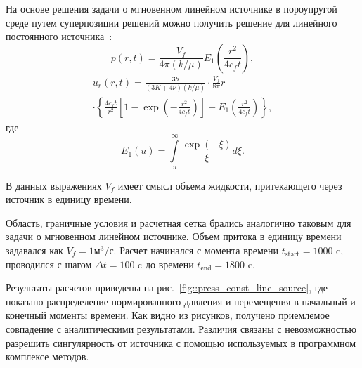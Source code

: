 На основе решения задачи о мгновенном линейном источнике в пороупругой среде
путем суперпозиции решений можно получить решение для линейного постоянного источника~\cite{wang_2000}:
%
\begin{equation}
\label{eq:constlinep}
p(r,t) = \frac{V_f}{4\pi (k/\mu)} E_1 \left(\frac{r^2}{4 c_f t}\right),
\end{equation}
%
\begin{multline}
\label{eq:constlinur}
u_r(r,t) = \frac{3b}{(3K+4\nu)(k/\mu)} \cdot \frac{V_f}{8 \pi} r \\ 
\cdot
\left\{ \frac{4 c_f t}{r^2}\left[1 - \exp{\left( -\frac{r^2}{4 c_f t}\right)} \right] + E_1 \left(\frac{r^2}{4 c_f t}\right) \right\},
\end{multline}
%
где
%
\begin{equation*}
E_1(u) = \int\limits_u^\infty \frac{\exp(-\xi)}{\xi} d\xi.
\end{equation*}

В данных выражениях $V_f$ имеет смысл объема жидкости, притекающего через источник в единицу времени.

Область, граничные условия и расчетная сетка брались аналогично таковым для задачи
о мгновенном линейном источнике. Объем притока в единицу времени задавался как $V_f = 1 \text{м}^3 / \text{с}$.
Расчет начинался с момента времени $t_{\text{start}}=1000$ c, проводился с шагом $\Delta t = 100$ c до времени $t_{\text{end}}=1800$ c.



Результаты расчетов приведены на
рис.~\ref{fig::press_const_line_source},
где показано распределение нормированного давления и перемещения в начальный и конечный моменты времени.
Как видно из рисунков, получено приемлемое совпадение с аналитическими результатами. Различия связаны с невозможностью
разрешить сингулярность от источника с помощью используемых в программном комплексе методов.

